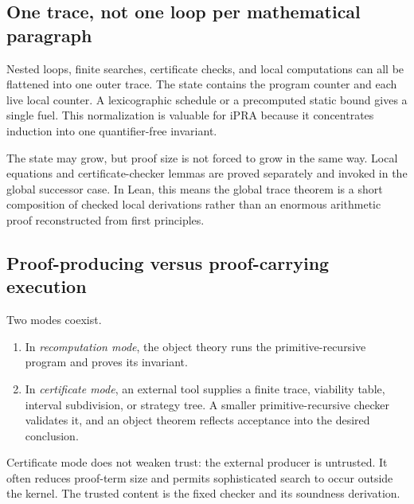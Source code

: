 \subsection{One trace, not one loop per mathematical paragraph}

Nested loops, finite searches, certificate checks, and local computations can all be flattened into one outer trace.  The state contains the program counter and each live local counter.  A lexicographic schedule or a precomputed static bound gives a single fuel.  This normalization is valuable for iPRA because it concentrates induction into one quantifier-free invariant.

The state may grow, but proof size is not forced to grow in the same way.  Local equations and certificate-checker lemmas are proved separately and invoked in the global successor case.  In Lean, this means the global trace theorem is a short composition of checked local derivations rather than an enormous arithmetic proof reconstructed from first principles.

\subsection{Proof-producing versus proof-carrying execution}

Two modes coexist.

\begin{enumerate}
\item In \emph{recomputation mode}, the object theory runs the primitive-recursive program and proves its invariant.
\item In \emph{certificate mode}, an external tool supplies a finite trace, viability table, interval subdivision, or strategy tree.  A smaller primitive-recursive checker validates it, and an object theorem reflects acceptance into the desired conclusion.
\end{enumerate}

Certificate mode does not weaken trust: the external producer is untrusted.  It often reduces proof-term size and permits sophisticated search to occur outside the kernel.  The trusted content is the fixed checker and its  soundness derivation.
